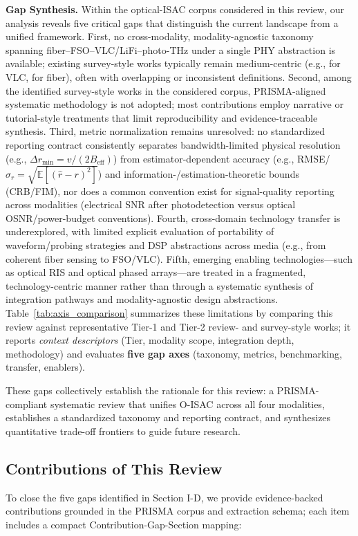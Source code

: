\documentclass[lettersize,journal]{IEEEtran}
\begin{document}
\textbf{Gap Synthesis.} Within the optical-ISAC corpus considered in this review, our analysis reveals five critical gaps that distinguish the current landscape from a unified framework. First, no cross-modality, modality-agnostic taxonomy spanning fiber--FSO--VLC/LiFi--photo-THz under a single PHY abstraction is available; existing survey-style works typically remain medium-centric (e.g., \cite{O_ISAC_303} for VLC, \cite{O_ISAC_006} for fiber), often with overlapping or inconsistent definitions. Second, among the identified survey-style works in the considered corpus, PRISMA-aligned systematic methodology is not adopted; most contributions employ narrative or tutorial-style treatments that limit reproducibility and evidence-traceable synthesis. Third, metric normalization remains unresolved: no standardized reporting contract consistently separates bandwidth-limited physical resolution (e.g., $\Delta r_{\min} = v/(2B_{\text{eff}})$) from estimator-dependent accuracy (e.g., RMSE/$\sigma_r = \sqrt{\mathbb{E}[(\hat r - r)^2]}$) and information-/estimation-theoretic bounds (CRB/FIM), nor does a common convention exist for signal-quality reporting across modalities (electrical SNR after photodetection versus optical OSNR/power-budget conventions). Fourth, cross-domain technology transfer is underexplored, with limited explicit evaluation of portability of waveform/probing strategies and DSP abstractions across media (e.g., from coherent fiber sensing to FSO/VLC). Fifth, emerging enabling technologies---such as optical RIS and optical phased arrays---are treated in a fragmented, technology-centric manner rather than through a systematic synthesis of integration pathways and modality-agnostic design abstractions. Table~\ref{tab:axis_comparison} summarizes these limitations by comparing this review against representative Tier-1 and Tier-2 review- and survey-style works; it reports \textit{context descriptors} (Tier, modality scope, integration depth, methodology) and evaluates \textbf{five gap axes} (taxonomy, metrics, benchmarking, transfer, enablers).


These gaps collectively establish the rationale for this review: a PRISMA-compliant systematic review that unifies O-ISAC across all four modalities, establishes a standardized taxonomy and reporting contract, and synthesizes quantitative trade-off frontiers to guide future research.

\subsection{Contributions of This Review}
To close the five gaps identified in Section I-D, we provide evidence-backed contributions grounded in the PRISMA corpus and extraction schema; each item includes a compact Contribution-Gap-Section mapping:
\end{document}

